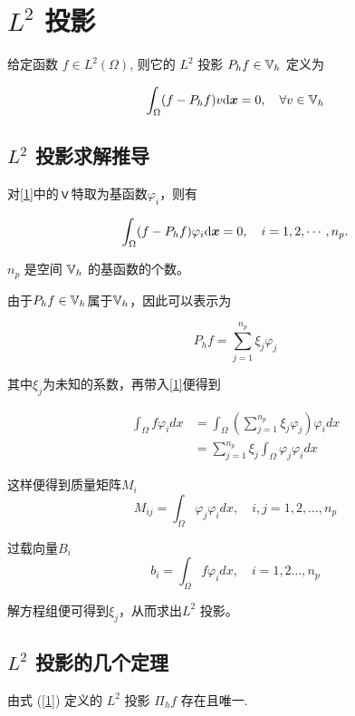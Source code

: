 \documentclass{article}
\begin{document}
\section{$L^2$ 投影}

给定函数 $f \in L^2(\Omega)$, 则它的 $L^2$ 投影 $P_hf \in {\mathbb V}_h$ 定义为

\begin{equation}\label{1}
    \int_\Omega (f - P_hf)v \mathrm{d} {\boldsymbol x} = 0, \quad \forall v \in {\mathbb V}_h
\end{equation}

\subsection{$L^2$ 投影求解推导}

对\ref{1}中的ｖ特取为基函数$\varphi_i$，则有

\begin{equation}
    \int_{\Omega} (f - P_hf)\varphi_i \mathrm{d} {\boldsymbol x} = 0, 
    \quad i = 1, 2, \cdots, n_{p}.
\end{equation}

$n_{p}$ 是空间 ${\mathbb V}_h$ 的基函数的个数。

由于$P_hf \in {\mathbb V}_h$属于${\mathbb V}_h$，因此可以表示为

\begin{equation}
P_{h} f=\sum_{j=1}^{n_{p}} \xi_{j} \varphi_{j}
\end{equation}

其中$\xi_{j}$为未知的系数，再带入\ref{1}便得到

\begin{equation}
\begin{aligned}
\int_{\Omega} f \varphi_{i} d x &=\int_{\Omega}\left(\sum_{j=1}^{n_{p}} \xi_{j} \varphi_{j}\right) \varphi_{i} d x \\
&=\sum_{j=1}^{n_{p}} \xi_{j} \int_{\Omega} \varphi_{j} \varphi_{i} d x
\end{aligned}
\end{equation}

这样便得到质量矩阵$M_i$
$$
M_{i j}=\int_{\Omega} \varphi_{j} \varphi_{i} d x, \quad i, j=1,2, \ldots, n_{p}
$$

过载向量$B_i$
$$
b_{i}=\int_{\Omega} f \varphi_{i} d x, \quad i=1,2 \ldots, n_{p}
$$

解方程组便可得到$\xi_{j}$，从而求出$L^2$ 投影。
\subsection{$L^2$ 投影的几个定理}
\begin{theorem}
    由式 (\ref{1}) 定义的 $L^2$ 投影 $\Pi_h f$ 存在且唯一.
\end{theorem}
\end{document}
